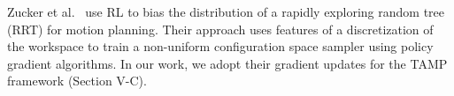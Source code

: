 Zucker et al.~\cite{workspacebias} use RL to bias the distribution of a rapidly exploring random tree (RRT)
for motion planning. Their approach uses features of a discretization of the workspace to train
a non-uniform configuration space sampler using policy gradient algorithms.
In our work, we adopt their gradient updates for the TAMP framework (Section V-C).